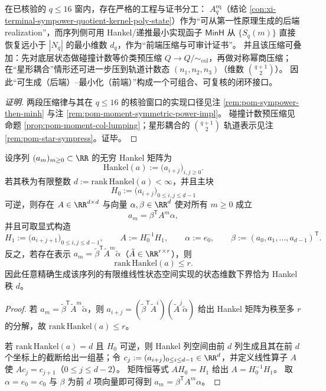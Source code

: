 \begin{conclusion}[二段式可执行压缩：\texorpdfstring{$\text{直积}\Rightarrow A^{\mathrm{eq}}_q\Rightarrow \mathsf{MinH}(S_q)$}{product=>Aeq=>MinH} 给出“后端可生成--前端最小证书”双轨闭环]\label{con:xi-terminal-two-stage-compression-sympower-minh}
在已核验的 \(q\le 16\) 窗内，存在严格的工程与证书分工：
\(A^{\mathrm{eq}}_q\)（结论 \ref{con:xi-terminal-sympower-quotient-kernel-poly-state}）作为“可从第一性原理生成的后端 realization”，而序列侧可用 Hankel/递推最小实现函子 \(\mathsf{MinH}\) 从 \(\{S_q(m)\}\) 直接恢复远小于 \(|N_q|\) 的最小维数 \(d_q\)，作为“前端压缩与可审计证书”。
并且该压缩可叠加：先对底层状态做碰撞计数等价类预压缩 \(Q\to Q/{\sim_{\mathrm{col}}}\)，再做对称幂商压缩；在“星形耦合”情形还可进一步压到轨道计数态 \((n_1,n_2,n_3)\)（维数 \(\binom{q+1}{2}\)）。
因此“可生成（后端）--最小化（前端）”构成一个可组合、可复核的闭环接口。
\end{conclusion}
\begin{proof}[证明]
两段压缩律与其在 \(q\le 16\) 的核验窗口的实现口径见注 \ref{rem:pom-sympower-then-minh} 与注 \ref{rem:pom-moment-symmetric-power-impl}。
碰撞计数预压缩见命题 \ref{prop:pom-moment-col-lumping}；星形耦合的 \(\binom{q+1}{2}\) 轨道表示见注 \ref{rem:pom-star-sympress}。证毕。
\end{proof}

\begin{theorem}\label{thm:xi-hankel-rank-minimal-linear-realization}
设序列 \((a_m)_{m\ge 0}\subset\RR\) 的无穷 Hankel 矩阵为
\[
\mathrm{Hankel}(a):=\bigl(a_{i+j}\bigr)_{i,j\ge 0}.
\]
若其秩为有限整数 \(d:=\mathrm{rank}\,\mathrm{Hankel}(a)<\infty\)，并且主块
\[
H_0:=\bigl(a_{i+j}\bigr)_{0\le i,j\le d-1}
\]
可逆，则存在 \(A\in\RR^{d\times d}\) 与向量 \(\alpha,\beta\in\RR^{d}\) 使对所有 \(m\ge 0\) 成立
\[
a_m=\beta^{\mathsf T}A^{m}\alpha,
\]
并且可取显式构造
\[
H_1:=\bigl(a_{i+j+1}\bigr)_{0\le i,j\le d-1},
\qquad
A:=H_0^{-1}H_1,\qquad
\alpha:=e_0,\qquad
\beta:=(a_0,a_1,\dots,a_{d-1})^{\mathsf T}.
\]
反之，若存在表示 \(a_m=\tilde\beta^{\mathsf T}\tilde A^{m}\tilde\alpha\)（\(\tilde A\in\RR^{r\times r}\)），则
\[
\mathrm{rank}\,\mathrm{Hankel}(a)\le r.
\]
因此任意精确生成该序列的有限维线性状态空间实现的状态维数下界恰为 Hankel 秩 \(d\)。
\end{theorem}
\begin{proof}
若 \(a_m=\tilde\beta^{\mathsf T}\tilde A^{m}\tilde\alpha\)，则
\(
a_{i+j}=(\tilde\beta^{\mathsf T}\tilde A^{i})(\tilde A^{j}\tilde\alpha)
\)
给出 Hankel 矩阵为秩至多 \(r\) 的分解，故 \(\mathrm{rank}\,\mathrm{Hankel}(a)\le r\)。
\par
若 \(\mathrm{rank}\,\mathrm{Hankel}(a)=d\) 且 \(H_0\) 可逆，则 Hankel 列空间由前 \(d\) 列生成且其在前 \(d\) 个坐标上的截断给出一组基；令 \(c_j:=(a_{i+j})_{0\le i\le d-1}\in\RR^{d}\)，并定义线性算子 \(A\) 使 \(Ac_j=c_{j+1}\)（\(0\le j\le d-2\)）。
矩阵恒等式 \(AH_0=H_1\) 给出 \(A=H_0^{-1}H_1\)。
取 \(\alpha=e_0=c_0\) 与 \(\beta\) 为前 \(d\) 项向量即可得到 \(a_m=\beta^{\mathsf T}A^{m}\alpha\)。
\end{proof}

